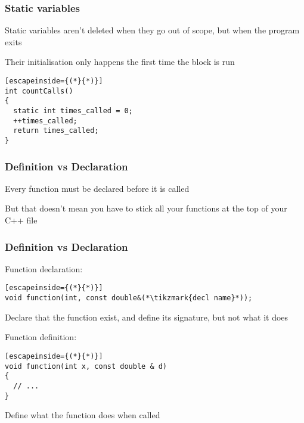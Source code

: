 \documentclass[14pt,a4paper,dvipsnames,usenames]{beamer}
\begin{document}
\begin{frame}[fragile]
  \frametitle{Static variables}

  Static variables aren't deleted when they go out of scope, but when the program exits

  \vspace{.5em}
  Their initialisation only happens the first time the block is run

  \vspace{.5em}
  \begin{lstlisting}[escapeinside={(*}{*)}]
int countCalls()
{
  static int times_called = 0;
  ++times_called;
  return times_called;
}
  \end{lstlisting}
  
\end{frame}

\begin{frame}[fragile]
  \frametitle{Definition vs Declaration}

  Every function must be declared before it is called

  \vspace{1em}
  But that doesn't mean you have to stick all your functions at the top of your C++ file
  
\end{frame}

\begin{frame}[fragile]
  \frametitle{Definition vs Declaration}

  Function declaration:

  \vspace{.5em}
  \begin{lstlisting}[escapeinside={(*}{*)}]
void function(int, const double&(*\tikzmark{decl name}*));
  \end{lstlisting}

  {\fontsize{10pt}{10pt}\selectfont
    Declare that the function exist, and define its signature, but not what it does
  }

  \nointerlineskip

  \vspace{1em}
  Function definition:

  \vspace{.5em}
  \begin{lstlisting}[escapeinside={(*}{*)}]
void function(int x, const double & d)
{
  // ...
}
  \end{lstlisting}

  {\fontsize{10pt}{10pt}\selectfont
    Define what the function does when called
  }
  
\end{frame}
\end{document}
